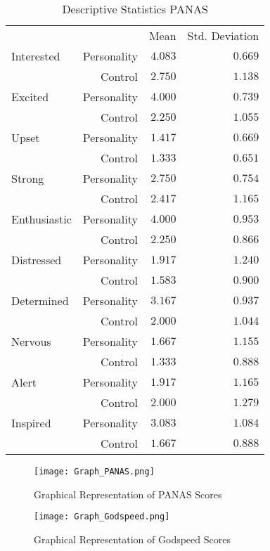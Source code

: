 \documentclass[runningheads]{llncs}
\begin{document}
\begin{table}[h!]
	\centering
	\caption{Descriptive Statistics PANAS}
	\label{descriptiveStatistics}
	{
		\begin{tabular}{lrrr}
			\toprule
			 &  & Mean & Std. Deviation  \\
			\cmidrule[0.4pt]{1-4}
			Interested & Personality & $4.083$ & $0.669$  \\
			 & Control & $2.750$ & $1.138$  \\
			Excited & Personality & $4.000$ & $0.739$  \\
			 & Control & $2.250$ & $1.055$  \\
			Upset & Personality & $1.417$ & $0.669$  \\
			 & Control & $1.333$ & $0.651$  \\
			Strong & Personality & $2.750$ & $0.754$  \\
			 & Control & $2.417$ & $1.165$  \\
			Enthusiastic & Personality & $4.000$ & $0.953$  \\
			 & Control & $2.250$ & $0.866$  \\
			Distressed & Personality & $1.917$ & $1.240$  \\
			 & Control & $1.583$ & $0.900$  \\
			Determined & Personality & $3.167$ & $0.937$  \\
			 & Control & $2.000$ & $1.044$  \\
			Nervous & Personality & $1.667$ & $1.155$  \\
			 & Control & $1.333$ & $0.888$  \\
			Alert & Personality & $1.917$ & $1.165$  \\
			 & Control & $2.000$ & $1.279$  \\
			Inspired & Personality & $3.083$ & $1.084$  \\
			 & Control & $1.667$ & $0.888$  \\
			\bottomrule
		\end{tabular}
        \label{ttt}
	}
\end{table}

\begin{figure}[h!]
    \centering
    \begin{minipage}[t]{0.48\textwidth}
        \centering
        \texttt{[image: Graph\_PANAS.png]}
        \caption{Graphical Representation of PANAS Scores}
        \label{Graph_PANAS1}
    \end{minipage}%
    \hfill
    \begin{minipage}[t]{0.48\textwidth}
        \centering
        \texttt{[image: Graph\_Godspeed.png]}
        \caption{Graphical Representation of Godspeed Scores}
        \label{Graph_PANAS2}
    \end{minipage}
\end{figure}
\end{document}
